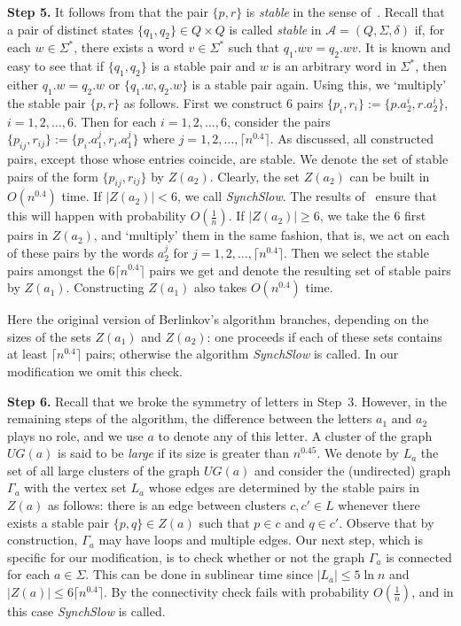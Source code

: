 \documentclass{llncs}
\begin{document}
\textbf{Step 5.} It follows from \cite[Theorem~3]{Berlinkov:preprint} that the pair $\{p,r\}$ is \emph{stable} in the sense of~\cite{CKK:2002}. Recall that a pair of distinct states $\{q_1,q_2\}\in Q\times Q$ is called \emph{stable} in $\mathcal{A}=(Q, \Sigma, \delta)$ if, for each $w \in \Sigma^*$, there exists a word $v \in \Sigma^*$ such that $q_1.wv = q_2.wv$. It is known and easy to see that if $\{q_1,q_2\}$ is a stable pair and $w$ is an arbitrary word in $\Sigma^*$, then either $q_1.w = q_2.w$ or $\{q_1.w,q_2.w\}$ is a stable pair again. Using this, we `multiply' the stable pair $\{p,r\}$ as follows. First we construct 6 pairs $\{p_i,r_i\}:=\{p.a_2^i, r.a_2^i\}$, $i=1, 2, \dots, 6$.  Then for each $i=1,2,\dots,6$, consider the pairs $\{p_{ij},r_{ij}\}:=\{p_i.a_1^j, r_i.a_1^j\}$ where $j=1,2,\dots,\lceil n^{0.4}\rceil$. As discussed, all constructed pairs, except those whose entries coincide, are stable. We denote the set of stable pairs of the form $\{p_{ij},r_{ij}\}$ by $Z(a_2)$. Clearly, the set $Z(a_2)$ can be built in $O(n^{0.4})$ time. If $|Z(a_2)|<6$, we call \emph{SynchSlow}. The results of~\cite[Lemmas~7 and~8]{Berlinkov:preprint} ensure that this will happen with probability $O(\frac1n)$. If $|Z(a_2)|\ge6$, we take the 6 first pairs in $Z(a_2)$, and `multiply' them in the same fashion, that is, we act on each of these pairs by the words $a_2^j$ for $j=1,2,\dots,\lceil n^{0.4}\rceil$.  Then we select the stable pairs amongst the $6\lceil n^{0.4}\rceil$ pairs we get and denote the resulting set of stable pairs by $Z(a_1)$. Constructing $Z(a_1)$ also takes $O(n^{0.4})$ time.

Here the original version of Berlinkov's algorithm branches, depending on the sizes of the sets $Z(a_1)$ and $Z(a_2)$: one proceeds if each of these sets contains at least $\lceil n^{0.4} \rceil$ pairs; otherwise the algorithm \emph{SynchSlow} is called. In our modification we omit this check.

\smallskip

\textbf{Step 6.} Recall that we broke the symmetry of letters in Step~3. However, in the remaining steps of the algorithm, the difference between the letters $a_1$ and $a_2$ plays no role, and we use $a$ to denote any of this letter. A cluster of the graph $U\!G(a)$ is said to be \emph{large} if its size is greater than $n^{0.45}$. We denote by $L_a$ the set of all large clusters of the graph $U\!G(a)$ and consider the (undirected) graph $\Gamma_a$ with the vertex set $L_a$ whose edges are determined by the stable pairs in $Z(a)$ as follows: there is an edge between clusters $c,c'\in L$ whenever there exists a stable pair $\{p, q\} \in Z(a)$ such that $p \in c$ and $q\in c'$. Observe that by construction, $\Gamma_a$ may have loops and multiple edges. Our next step, which is specific for our modification, is to check whether or not the graph $\Gamma_a$ is connected for each $a\in\Sigma$. This can be done in sublinear time since $|L_a|\le 5\ln n$ and $|Z(a)|\le 6\lceil n^{0.4}\rceil$. By \cite[Lemma~3]{Berlinkov:preprint} the connectivity check fails with probability $O(\frac1n)$, and in this case \emph{SynchSlow} is called.
\end{document}
